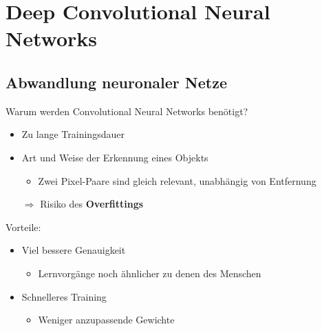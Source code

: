 \documentclass[
	aspectratio=169,
	8pt
]{beamer}
\begin{document}
\section{Deep Convolutional Neural Networks}
\subsection{Abwandlung neuronaler Netze}
\begin{frame}[t]{\insertsubsection}
Warum werden Convolutional Neural Networks benötigt?
\begin{itemize}
\item Zu lange Trainingsdauer
\item Art und Weise der Erkennung eines Objekts
\begin{itemize}
\item Zwei Pixel-Paare sind gleich relevant, unabhängig von Entfernung
\end{itemize}
\item[\color{presentationRed}$\Rightarrow$] Risiko des \textbf{Overfittings}
\end{itemize}
Vorteile:
\begin{itemize}
\item Viel bessere Genauigkeit
\begin{itemize}
\item Lernvorgänge noch ähnlicher zu denen des Menschen
\end{itemize}
\item Schnelleres Training
\begin{itemize}
\item Weniger anzupassende Gewichte
\end{itemize}
\end{itemize}
\end{frame}
\end{document}

